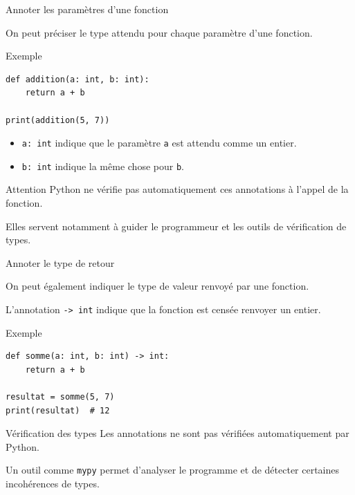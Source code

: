 \documentclass[10pt]{beamer}
\begin{document}
\begin{frame}[fragile]{Annoter les paramètres d'une fonction}

On peut préciser le type attendu pour chaque paramètre
d'une fonction.

\begin{exampleblock}{Exemple}
\small
\begin{lstlisting}
def addition(a: int, b: int):
    return a + b

print(addition(5, 7))
\end{lstlisting}
\end{exampleblock}

\begin{itemize}
    \item \texttt{a: int} indique que le paramètre \texttt{a}
    est attendu comme un entier.
    \item \texttt{b: int} indique la même chose pour \texttt{b}.
\end{itemize}

\begin{alertblock}{Attention}
\small
Python ne vérifie pas automatiquement ces annotations
à l'appel de la fonction.

Elles servent notamment à guider le programmeur et les outils
de vérification de types.
\end{alertblock}

\end{frame}
\begin{frame}[fragile]{Annoter le type de retour}

On peut également indiquer le type de valeur renvoyé
par une fonction.

L'annotation \texttt{-> int} indique que la fonction
est censée renvoyer un entier.

\begin{exampleblock}{Exemple}
\small
\begin{lstlisting}
def somme(a: int, b: int) -> int:
    return a + b

resultat = somme(5, 7)
print(resultat)  # 12
\end{lstlisting}
\end{exampleblock}

\begin{block}{Vérification des types}
\small
Les annotations ne sont pas vérifiées automatiquement
par Python.

Un outil comme \texttt{mypy} permet d'analyser le programme
et de détecter certaines incohérences de types.
\end{block}

\end{frame}
\end{document}
